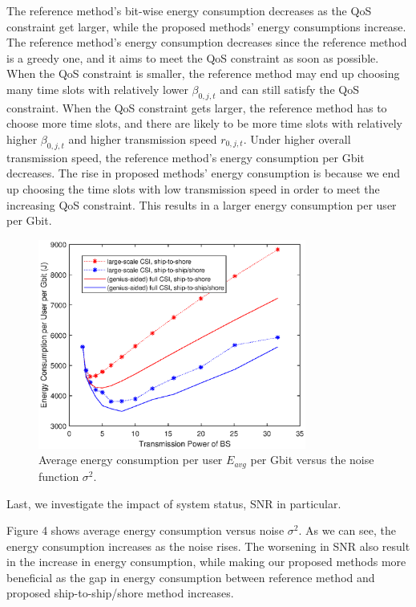 \documentclass[conference]{IEEEtran}
\begin{document}
The reference method's bit-wise energy consumption decreases as the QoS constraint get larger, while the proposed methods' energy consumptions increase. The reference method's energy consumption decreases since the reference method is a greedy one, and it aims to meet the QoS constraint as soon as possible. When the QoS constraint is smaller, the reference method may end up choosing many time slots with relatively lower ${\beta _{0,j,t}}$ and can still satisfy the QoS constraint. When the QoS constraint gets larger, the reference method has to choose more time slots, and there are likely to be more time slots with relatively higher ${\beta _{0,j,t}}$ and higher transmission speed ${r_{0,j,t}}$. Under higher overall transmission speed, the reference method's energy consumption per Gbit decreases. The rise in proposed methods' energy consumption is because we end up choosing the time slots with low transmission speed in order to meet the increasing QoS constraint. This results in a larger energy consumption per user per Gbit. 



\begin{figure} [htb]
\begin{center}
\includegraphics*[width=8.8cm]{snrs.eps}
\end{center}
\vspace*{-4mm} 
\caption{Average energy consumption per user $E_{avg}$ per Gbit versus the noise function ${\sigma ^2}$.}\label{fig:5}
\vspace*{-2mm} 
\end{figure}

Last, we investigate the impact of system status, SNR in particular.

Figure 4 shows average energy consumption versus noise ${\sigma ^2}$. As we can see, the energy consumption increases as the noise rises. %
The worsening in SNR also result in the increase in energy consumption, while making our proposed methods more beneficial as the gap in energy consumption between reference method and proposed ship-to-ship/shore method increases. %
\end{document}
